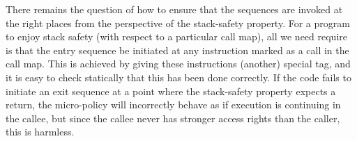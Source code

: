 \documentclass[acmsmall,review,anonymous]{acmart}\settopmatter{printfolios=true,printccs=false,printacmref=false}
\newcommand*{\rsp}{\textsc{sp}}
\begin{document}
{There remains the question of how to ensure that the sequences are
invoked at the right places from the perspective of the stack-safety
property. For a program to enjoy stack safety
(with respect to a particular call map), all we need require is that
the entry sequence be initiated at any instruction marked as a call
in the call map. This is achieved by giving these instructions (another) special tag,
and it is easy to check statically that this has been done correctly.
If the code fails to initiate an exit
sequence at a point where the stack-safety property expects a return,
the micro-policy will incorrectly behave as if execution
is continuing in the callee, but since the callee never has stronger access
rights than the caller, this is harmless.




}
\end{document}
